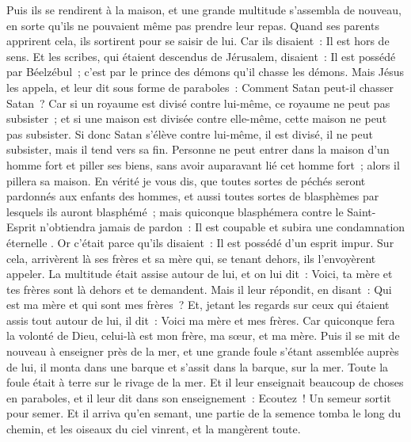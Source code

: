 \begin{multicols}{2}
Puis ils se rendirent à la maison, et une grande multitude s'assembla de nouveau, en sorte qu'ils ne pouvaient même pas prendre leur repas.
Quand ses parents apprirent cela, ils sortirent pour se saisir de lui. Car ils disaient~: Il est hors de sens.
Et les scribes, qui étaient descendus de Jérusalem, disaient~: Il est possédé par Béelzébul~; c'est par le prince des démons qu'il chasse les démons.
Mais Jésus les appela, et leur dit sous forme de paraboles~: Comment Satan peut-il chasser Satan~?
Car si un royaume est divisé contre lui-même, ce royaume ne peut pas subsister~;
et si une maison est divisée contre elle-même, cette maison ne peut pas subsister.
Si donc Satan s'élève contre lui-même, il est divisé, il ne peut subsister, mais il tend vers sa fin.
Personne ne peut entrer dans la maison d'un homme fort et piller ses biens, sans avoir auparavant lié cet homme fort~; alors il pillera sa maison.
En vérité je vous dis, que toutes sortes de péchés seront pardonnés aux enfants des hommes, et aussi toutes sortes de blasphèmes par lesquels ils auront blasphémé~;
mais quiconque blasphémera contre le Saint-Esprit n'obtiendra jamais de pardon~: Il est coupable et subira une condamnation éternelle .
Or c'était parce qu'ils disaient~: Il est possédé d'un esprit impur.
Sur cela, arrivèrent là ses frères et sa mère qui, se tenant dehors, ils l'envoyèrent appeler. La multitude était assise autour de lui,
et on lui dit~: Voici, ta mère et tes frères sont là dehors et te demandent.
Mais il leur répondit, en disant~: Qui est ma mère et qui sont mes frères~?
Et, jetant les regards sur ceux qui étaient assis tout autour de lui, il dit~: Voici ma mère et mes frères.
Car quiconque fera la volonté de Dieu, celui-là est mon frère, ma sœur, et ma mère.
\VerseOne{}Puis il se mit de nouveau à enseigner près de la mer, et une grande foule s'étant assemblée auprès de lui, il monta dans une barque et s'assit dans la barque, sur la mer. Toute la foule était à terre sur le rivage de la mer.
Et il leur enseignait beaucoup de choses en paraboles, et il leur dit dans son enseignement~:
Ecoutez~! Un semeur sortit pour semer.
Et il arriva qu'en semant, une partie de la semence tomba le long du chemin, et les oiseaux du ciel vinrent, et la mangèrent toute.

\end{multicols}

